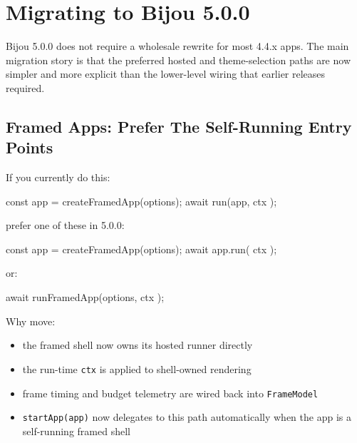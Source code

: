 \chapter{Migrating to Bijou 5.0.0}\label{record-269}

\smallskip

Bijou 5.0.0 does not require a wholesale rewrite for most 4.4.x apps. The main migration story is that the preferred hosted and theme-selection paths are now simpler and more explicit than the lower-level wiring that earlier releases required.

\section{Framed Apps: Prefer The Self-Running Entry Points}\label{record-269-framed-apps-prefer-the-self-running-entry-points}

If you currently do this:

\begin{CodeBlock}
const app = createFramedApp(options);
await run(app, { ctx });
\end{CodeBlock}

prefer one of these in 5.0.0:

\begin{CodeBlock}
const app = createFramedApp(options);
await app.run({ ctx });
\end{CodeBlock}

or:

\begin{CodeBlock}
await runFramedApp(options, { ctx });
\end{CodeBlock}

Why move:

\begin{itemize}
\tightlist
\item
  the framed shell now owns its hosted runner directly
\item
  the run-time \texttt{c\allowbreak{}t\allowbreak{}x} is applied to shell-owned rendering
\item
  frame timing and budget telemetry are wired back into \texttt{F\allowbreak{}r\allowbreak{}a\allowbreak{}m\allowbreak{}e\allowbreak{}M\allowbreak{}o\allowbreak{}d\allowbreak{}e\allowbreak{}l}
\item
  \texttt{s\allowbreak{}t\allowbreak{}a\allowbreak{}r\allowbreak{}t\allowbreak{}A\allowbreak{}p\allowbreak{}p\allowbreak{}(\allowbreak{}a\allowbreak{}p\allowbreak{}p\allowbreak{})} now delegates to this path automatically when the app is a self-running framed shell
\end{itemize}

